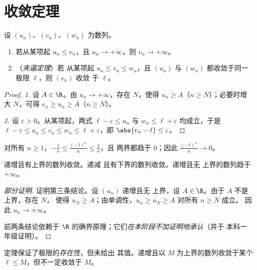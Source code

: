 \section{收敛定理}

\begin{theorem}[比较定理与夹逼定理]\label{thm:g12:seq:squeeze}
设 $(u_n)$、$(v_n)$、$(w_n)$ 为数列。
\begin{enumerate}
  \item 若从某项起 $u_n \leq v_n$，且 $u_n \to +\infty$，则
        $v_n \to +\infty$。
  \item （\emph{夹逼定理}）若
        从某项起 $u_n \leq v_n \leq w_n$，且 $(u_n)$ 与 $(w_n)$
        都收敛于同一极限 $\ell$，则 $(v_n)$ 收敛
        于 $\ell$。
\end{enumerate}
\end{theorem}

\begin{proof}
\emph{1.} 设 $A \in \R$。由 $u_n \to +\infty$，存在 $N$，使得
$u_n \geq A$（$n \geq N$）；必要时增大 $N$，可得
$v_n \geq u_n \geq A$（$n \geq N$）。

\emph{2.} 设 $\varepsilon > 0$。从某项起，两式
$\ell - \varepsilon \leq u_n$ 与 $w_n \leq \ell + \varepsilon$ 均成立，于是
$\ell - \varepsilon \leq u_n \leq v_n \leq w_n \leq \ell + \varepsilon$，即
$\abs{v_n - \ell} \leq \varepsilon$。
\end{proof}

\begin{example}
对所有 $n \geq 1$，$-\frac{1}{n} \leq \frac{(-1)^n}{n} \leq \frac{1}{n}$，且
两界都趋于 $0$；因此 $\frac{(-1)^n}{n} \to 0$。
\end{example}

\begin{theorem}[单调收敛定理]\label{thm:g12:seq:monotone}
递增且有上界的数列收敛。递减
且有下界的数列收敛。递增且无
上界的数列趋于 $+\infty$。
\end{theorem}

\begin{proof}[部分证明]
证明第三条结论。设 $(u_n)$ 递增且无
上界，设 $A \in \R$。由于 $A$ 不是上界，存在 $N$，
使得 $u_N \geq A$；由单调性，$u_n \geq u_N \geq A$ 对所有 $n \geq N$ 成立。
因此 $u_n \to +\infty$。

前两条结论依赖于
$\R$ 的确界原理；它们\emph{在本阶段不加证明地承认}（并于
本科一年级证明）。
\end{proof}

\begin{remark}
定理保证了极限的\emph{存在性}，但未给出
其值。递增且以 $M$ 为上界的数列收敛于某个
$\ell \leq M$，但不一定收敛于 $M$。
\end{remark}

